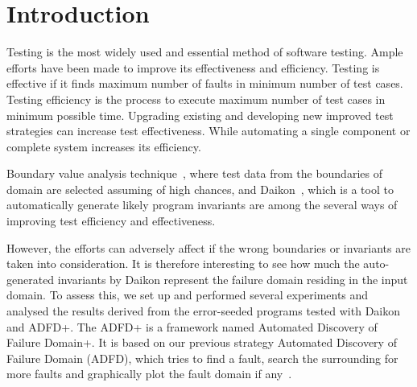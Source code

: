 \documentclass{acm_proc_article-sp}
\begin{document}








\section{Introduction}\label{sec:intro}
Testing is the most widely used and essential method of software testing. Ample efforts have been made to improve its effectiveness and efficiency. Testing is effective if it finds maximum number of faults in minimum number of test cases. Testing efficiency is the process to execute maximum number of test cases in minimum possible time. Upgrading existing and developing new improved test strategies can increase test effectiveness. While automating a single component or complete system increases its efficiency.

Boundary value analysis technique~\cite{}, where test data from the boundaries of domain are selected assuming of high chances, and Daikon~\cite{}, which is a tool to automatically generate likely program invariants are among the several ways of improving test efficiency and effectiveness.

However, the efforts can adversely affect if the wrong boundaries or invariants are taken into consideration. It is therefore interesting to see how much the auto-generated invariants by Daikon represent the failure domain residing in the input domain. To assess this, we set up and performed several experiments and analysed the results derived from the error-seeded programs tested with Daikon and ADFD+. The ADFD+ is a framework named Automated Discovery of Failure Domain+. It is based on our previous strategy Automated Discovery of Failure Domain (ADFD), which tries to find a fault, search the surrounding for more faults and graphically plot the fault domain if any~\cite{ahmad2013adfd}.  
\end{document}

